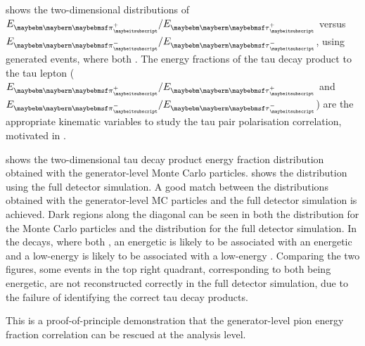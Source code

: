  shows the two-dimensional distributions of $E_{\Ppiplus} / E_{\APtauon}$ versus $E_{\Ppiminus} / E_{\Ptauon}$, using generated \eeZZQQ events, where both \tauToPionBoth. The energy fractions of the tau decay product to the tau lepton ($E_{\Ppiplus} / E_{\APtauon}$ and $E_{\Ppiminus} / E_{\Ptauon}$) are the appropriate kinematic variables to study the tau pair polarisation correlation, motivated in .



 shows the  two-dimensional  tau decay product energy fraction distribution obtained with the generator-level  Monte Carlo particles.  shows the distribution using the full detector simulation. A good match between the distributions obtained with  the generator-level  MC particles and the full detector simulation is achieved. Dark regions along the diagonal can be seen in both the distribution for the Monte Carlo particles and the distribution for the full detector simulation. In the \ZToTauTau decays, where both \tauToPionBoth, an energetic \Pgppm is likely to be associated with an energetic \Pgpmp and a low-energy \Pgppm is  likely to be associated with a low-energy \Pgpmp. Comparing the two figures, some events in the top right quadrant, corresponding to  both \Ppipm being energetic, are not reconstructed correctly in the full detector simulation, due to the failure of identifying the correct tau decay products.

This is a proof-of-principle demonstration that the generator-level pion energy fraction correlation can be rescued at the analysis level.





